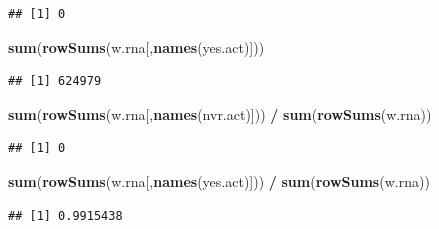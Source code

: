\documentclass[]{article}
\newenvironment{Shaded}{\begin{snugshade}}{\end{snugshade}}
\newcommand{\KeywordTok}[1]{\textcolor[rgb]{0.13,0.29,0.53}{\textbf{#1}}}
\newcommand{\StringTok}[1]{\textcolor[rgb]{0.31,0.60,0.02}{#1}}
\newcommand{\CommentTok}[1]{\textcolor[rgb]{0.56,0.35,0.01}{\textit{#1}}}
\newcommand{\OperatorTok}[1]{\textcolor[rgb]{0.81,0.36,0.00}{\textbf{#1}}}
\newcommand{\NormalTok}[1]{#1}
\begin{document}
\begin{verbatim}
## [1] 0
\end{verbatim}

\begin{Shaded}
\begin{Highlighting}[]
\KeywordTok{sum}\NormalTok{(}\KeywordTok{rowSums}\NormalTok{(w.rna[,}\KeywordTok{names}\NormalTok{(yes.act)]))}
\end{Highlighting}
\end{Shaded}

\begin{verbatim}
## [1] 624979
\end{verbatim}

\begin{Shaded}
\begin{Highlighting}[]
\KeywordTok{sum}\NormalTok{(}\KeywordTok{rowSums}\NormalTok{(w.rna[,}\KeywordTok{names}\NormalTok{(nvr.act)])) }\OperatorTok{/}\StringTok{ }\KeywordTok{sum}\NormalTok{(}\KeywordTok{rowSums}\NormalTok{(w.rna))}
\end{Highlighting}
\end{Shaded}

\begin{verbatim}
## [1] 0
\end{verbatim}

\begin{Shaded}
\begin{Highlighting}[]
\KeywordTok{sum}\NormalTok{(}\KeywordTok{rowSums}\NormalTok{(w.rna[,}\KeywordTok{names}\NormalTok{(yes.act)])) }\OperatorTok{/}\StringTok{ }\KeywordTok{sum}\NormalTok{(}\KeywordTok{rowSums}\NormalTok{(w.rna))}
\end{Highlighting}
\end{Shaded}

\begin{verbatim}
## [1] 0.9915438
\end{verbatim}

\begin{Shaded}
\end{Shaded}
\end{document}
